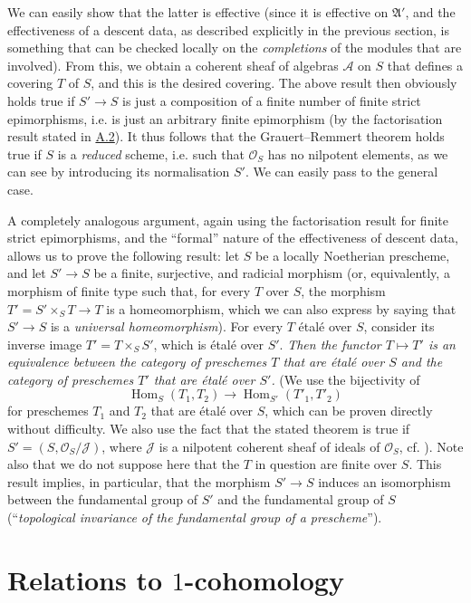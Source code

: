 \documentclass{article}
\newcommand{\scr}[1]{{\mathscr{#1}}}
\newcommand{\fk}[1]{{\mathfrak{#1}}}
\DeclareMathOperator{\Hom}{Hom}
\newcommand{\oldpage}[1]{\marginpar{\footnotesize$\Big\vert$ \textit{p.~#1}}}
\begin{document}
We can easily show that the latter is effective (since it is effective on $\fk{A}'$, and the effectiveness of a descent data, as described explicitly in the previous section, is something that can be checked locally on the \emph{completions} of the modules that are involved).
From this, we obtain a coherent sheaf of algebras $\scr{A}$ on $S$ that defines a covering $T$ of $S$, and this is the desired covering.
The above result then obviously holds true if $S'\to S$ is just a composition of a finite number of finite strict epimorphisms, i.e. is just an arbitrary finite epimorphism (by the factorisation result stated in \hyperref[A.2]{A.2}).
It thus follows that the Grauert--Remmert theorem holds true if $S$ is a \emph{reduced} scheme, i.e. such that $\scr{O}_S$ has no nilpotent elements, as we can see by introducing its normalisation $S'$.
We can easily pass to the general case.

A completely analogous argument, again using the factorisation result for finite strict epimorphisms, and the ``formal'' nature of the effectiveness of descent data, allows us to prove the following result:
let $S$ be a locally Noetherian prescheme, and let $S'\to S$ be a finite, surjective, and radicial morphism (or, equivalently, a morphism of finite type such that, for every $T$ over $S$, the morphism $T'=S'\times_S T\to T$ is a homeomorphism, which we can also express by saying that $S'\to S$ is a \emph{universal homeomorphism}).
For every $T$ \'{e}tal\'{e} over $S$, consider its inverse image $T'=T\times_S S'$, which is \'{e}tal\'{e} over $S'$.
\emph{Then the functor $T\mapsto T'$ is an equivalence between the category of preschemes $T$ that are \'{e}tal\'{e} over $S$ and the category of preschemes $T'$ that are \'{e}tal\'{e} over $S'$.}
(We use the bijectivity of
\[
  \Hom_S(T_1,T_2) \to \Hom_{S'}(T'_1,T'_2)
\]
for preschemes $T_1$ and $T_2$ that are \'{e}tal\'{e} over $S$, which can be proven directly without difficulty. We also use the fact that the stated theorem is true if $S'=(S,\scr{O}_S/\scr{J})$,
\oldpage{190-12}
where $\scr{J}$ is a nilpotent coherent sheaf of ideals of $\scr{O}_S$, cf. \cite[Lemma~6]{4}).
Note also that we do not suppose here that the $T$ in question are finite over $S$.
This result implies, in particular, that the morphism $S'\to S$ induces an isomorphism between the fundamental group of $S'$ and the fundamental group of $S$ (``\emph{topological invariance of the fundamental group of a prescheme}'').


\section{Relations to \texorpdfstring{$1$}{1}-cohomology}
\label{A.4}
\end{document}
